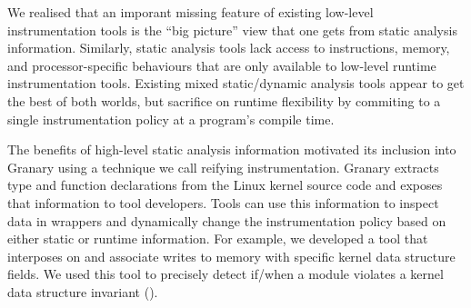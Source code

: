 \documentclass[preprint]{sigplanconf}
\begin{document}

We realised that an imporant missing feature of existing low-level instrumentation tools is the ``big picture'' view that one gets from static analysis information. Similarly, static analysis tools lack access to instructions, memory, and processor-specific behaviours that are only available to low-level runtime instrumentation tools. Existing mixed static/dynamic analysis tools \cite{NaCl,AddressSanitizer,ThreadSanitizer} appear to get the best of both worlds, but sacrifice on runtime flexibility by commiting to a single instrumentation policy at a program's compile time.

The benefits of high-level static analysis information motivated its inclusion into Granary using a technique we call reifying instrumentation. Granary extracts type and function declarations from the Linux kernel source code and exposes that information to tool developers. Tools can use this information to inspect data in wrappers and dynamically change the instrumentation policy based on either static or runtime information. For example, we developed a tool that interposes on and associate writes to memory with specific kernel data structure fields. We used this tool to precisely detect if/when a module violates a kernel data structure invariant ().
\end{document}
